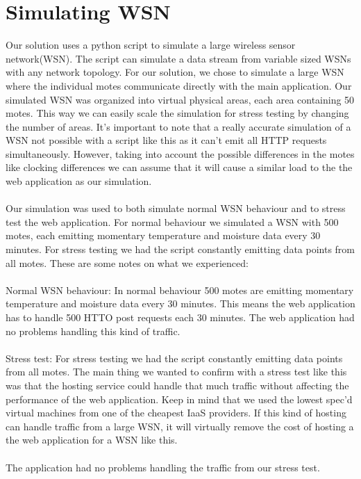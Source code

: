 \documentclass[]{uiophd}
\begin{document}
\section{Simulating WSN}
Our solution uses a python script to simulate a large wireless sensor network(WSN). The script can simulate a data stream from variable sized WSNs with any network topology. For our solution, we chose to simulate a large WSN where the individual motes communicate directly with the main application. Our simulated WSN was organized into virtual physical areas, each area containing 50 motes. This way we can easily scale the simulation for stress testing by changing the number of areas. It’s important to note that a really accurate simulation of a WSN not possible with a script like this as it can’t emit all HTTP requests simultaneously. However, taking into account the possible differences in the motes like clocking differences we can assume that it will cause a similar load to the the web application as our simulation.
\\\\
Our simulation was used to both simulate normal WSN behaviour and to stress test the web application. For normal behaviour we simulated a WSN with 500 motes, each emitting momentary temperature and moisture data every 30 minutes. For stress testing we had the script constantly emitting data points from all motes. These are some notes on what we experienced:
\\\\
Normal WSN behaviour: In normal behaviour 500 motes are emitting momentary temperature and moisture data every 30 minutes. This means the web application has to handle 500 HTTO post requests each 30 minutes. The web application had no problems handling this kind of traffic.
\\\\
Stress test:  For stress testing we had the script constantly emitting data points from all motes. The main thing we wanted to confirm with a stress test like this was that the hosting service could handle that much traffic without affecting the performance of the web application. Keep in mind that we used the lowest spec’d virtual machines from one of the cheapest IaaS providers. If this kind of hosting can handle traffic from a large WSN, it will virtually remove the cost of hosting a the web application for a WSN like this. 
\\\\
The application had no problems handling the traffic from our stress test.
\end{document}
